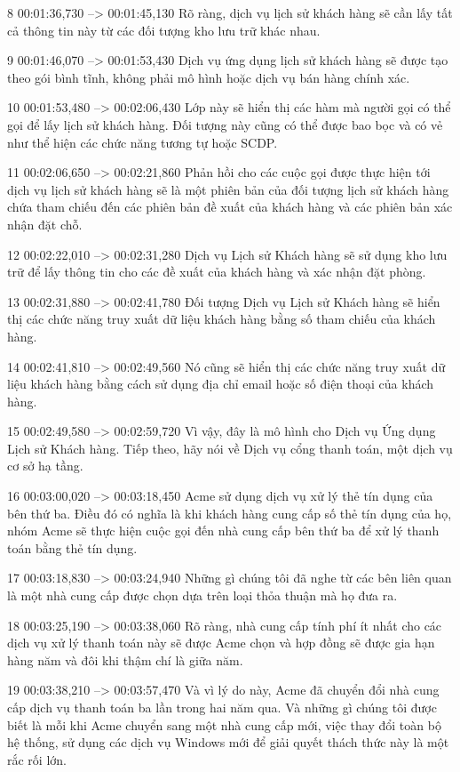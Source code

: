 8
00:01:36,730 --> 00:01:45,130
Rõ ràng, dịch vụ lịch sử khách hàng sẽ cần lấy tất cả thông tin này từ các đối tượng kho lưu trữ khác nhau.

9
00:01:46,070 --> 00:01:53,430
Dịch vụ ứng dụng lịch sử khách hàng sẽ được tạo theo gói bình tĩnh, không phải mô hình hoặc dịch vụ bán hàng chính xác.

10
00:01:53,480 --> 00:02:06,430
Lớp này sẽ hiển thị các hàm mà người gọi có thể gọi để lấy lịch sử khách hàng.  Đối tượng này cũng có thể được bao bọc và có vẻ như thể hiện các chức năng tương tự hoặc SCDP.

11
00:02:06,650 --> 00:02:21,860
Phản hồi cho các cuộc gọi được thực hiện tới dịch vụ lịch sử khách hàng sẽ là một phiên bản của đối tượng lịch sử khách hàng chứa tham chiếu đến các phiên bản đề xuất của khách hàng và các phiên bản xác nhận đặt chỗ.

12
00:02:22,010 --> 00:02:31,280
Dịch vụ Lịch sử Khách hàng sẽ sử dụng kho lưu trữ để lấy thông tin cho các đề xuất của khách hàng và xác nhận đặt phòng.

13
00:02:31,880 --> 00:02:41,780
Đối tượng Dịch vụ Lịch sử Khách hàng sẽ hiển thị các chức năng truy xuất dữ liệu khách hàng bằng số tham chiếu của khách hàng.

14
00:02:41,810 --> 00:02:49,560
Nó cũng sẽ hiển thị các chức năng truy xuất dữ liệu khách hàng bằng cách sử dụng địa chỉ email hoặc số điện thoại của khách hàng.

15
00:02:49,580 --> 00:02:59,720
Vì vậy, đây là mô hình cho Dịch vụ Ứng dụng Lịch sử Khách hàng.  Tiếp theo, hãy nói về Dịch vụ cổng thanh toán, một dịch vụ cơ sở hạ tầng.

16
00:03:00,020 --> 00:03:18,450
Acme sử dụng dịch vụ xử lý thẻ tín dụng của bên thứ ba.  Điều đó có nghĩa là khi khách hàng cung cấp số thẻ tín dụng của họ, nhóm Acme sẽ thực hiện cuộc gọi đến nhà cung cấp bên thứ ba để xử lý thanh toán bằng thẻ tín dụng.

17
00:03:18,830 --> 00:03:24,940
Những gì chúng tôi đã nghe từ các bên liên quan là một nhà cung cấp được chọn dựa trên loại thỏa thuận mà họ đưa ra.

18
00:03:25,190 --> 00:03:38,060
Rõ ràng, nhà cung cấp tính phí ít nhất cho các dịch vụ xử lý thanh toán này sẽ được Acme chọn và hợp đồng sẽ được gia hạn hàng năm và đôi khi thậm chí là giữa năm.

19
00:03:38,210 --> 00:03:57,470
Và vì lý do này, Acme đã chuyển đổi nhà cung cấp dịch vụ thanh toán ba lần trong hai năm qua.  Và những gì chúng tôi được biết là mỗi khi Acme chuyển sang một nhà cung cấp mới, việc thay đổi toàn bộ hệ thống, sử dụng các dịch vụ Windows mới để giải quyết thách thức này là một rắc rối lớn.


